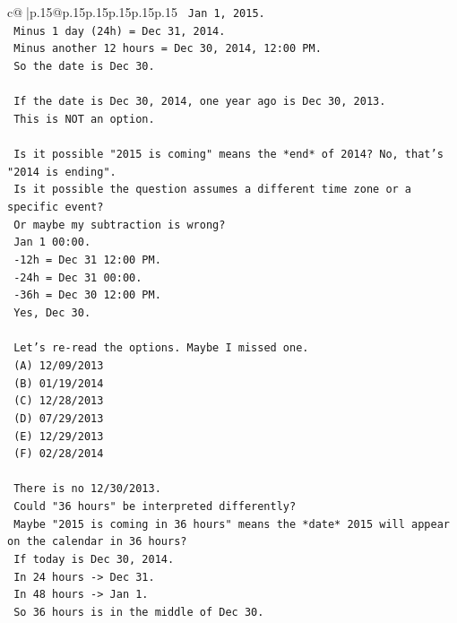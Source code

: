 \documentclass{article}
\begin{document}
{\begin{supertabular}{c@{$\;$}|p{.15\linewidth}@{}p{.15\linewidth}p{.15\linewidth}p{.15\linewidth}p{.15\linewidth}p{.15\linewidth}}
{{{\texttt{    Jan 1, 2015.} \\
\texttt{    Minus 1 day (24h) = Dec 31, 2014.} \\
\texttt{    Minus another 12 hours = Dec 30, 2014, 12:00 PM.} \\
\texttt{    So the date is Dec 30.} \\
\\ 
\texttt{    If the date is Dec 30, 2014, one year ago is Dec 30, 2013.} \\
\texttt{    This is NOT an option.} \\
\\ 
\texttt{    Is it possible "2015 is coming" means the *end* of 2014? No, that's "2014 is ending".} \\
\texttt{    Is it possible the question assumes a different time zone or a specific event?} \\
\texttt{    Or maybe my subtraction is wrong?} \\
\texttt{    Jan 1 00:00.} \\
\texttt{    {-}12h = Dec 31 12:00 PM.} \\
\texttt{    {-}24h = Dec 31 00:00.} \\
\texttt{    {-}36h = Dec 30 12:00 PM.} \\
\texttt{    Yes, Dec 30.} \\
\\ 
\texttt{    Let's re{-}read the options. Maybe I missed one.} \\
\texttt{    (A) 12/09/2013} \\
\texttt{    (B) 01/19/2014} \\
\texttt{    (C) 12/28/2013} \\
\texttt{    (D) 07/29/2013} \\
\texttt{    (E) 12/29/2013} \\
\texttt{    (F) 02/28/2014} \\
\\ 
\texttt{    There is no 12/30/2013.} \\
\texttt{    Could "36 hours" be interpreted differently?} \\
\texttt{    Maybe "2015 is coming in 36 hours" means the *date* 2015 will appear on the calendar in 36 hours?} \\
\texttt{    If today is Dec 30, 2014.} \\
\texttt{    In 24 hours {-}> Dec 31.} \\
\texttt{    In 48 hours {-}> Jan 1.} \\
\texttt{    So 36 hours is in the middle of Dec 30.} \\
}}}
\end{supertabular}}
\end{document}
